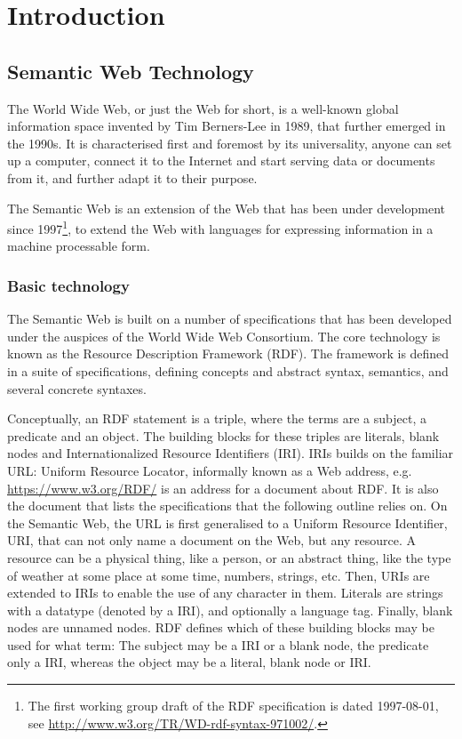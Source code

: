 \chapter{Introduction}

\section{Semantic Web Technology}\label{sec:semwebtech}

The World Wide Web, or just the Web for short, is a well-known global
information space invented by Tim Berners-Lee in 1989, that further emerged
in the 1990s. It is characterised first and foremost by its
universality, anyone can set up a computer, connect it to the Internet and
start serving data or documents from it, and further adapt it to their purpose. 

The Semantic Web is an extension of the Web that has been under
development since 1997\footnote{The first working group draft of the
  RDF specification is dated 1997-08-01, see
  \url{http://www.w3.org/TR/WD-rdf-syntax-971002/}.}, to extend the
Web with languages for expressing information in a machine processable
form\cite{semwebroadmap}.

\subsection{Basic technology}

The Semantic Web is built on a number of specifications that has been
developed under the auspices of the World Wide Web Consortium. The
core technology is known as the Resource Description Framework
(RDF). The framework is defined in a suite of specifications, defining
concepts and abstract syntax, semantics, and several concrete
syntaxes.

Conceptually, an RDF statement is a triple, where the terms are a
subject, a predicate and an object. The building blocks for these
triples are literals, blank nodes and Internationalized Resource
Identifiers (IRI). IRIs builds on the familiar URL: Uniform Resource
Locator, informally known as a Web address,
e.g. \url{https://www.w3.org/RDF/} is an address for a document about
RDF. It is also the document that lists the specifications that the
following outline relies on. 
On the Semantic Web, the URL is first generalised to a Uniform
Resource Identifier, URI, that can not only name a document on the
Web, but any resource. A resource can be a physical thing, like a
person, or an abstract thing, like the type of weather at some place
at some time, numbers, strings, etc. Then, URIs are extended to IRIs
to enable the use of any character in them. Literals are strings with
a datatype (denoted by a IRI), and optionally a language tag. Finally,
blank nodes are unnamed nodes. RDF defines which of these building
blocks may be used for what term: The subject may be a IRI or a blank
node, the predicate only a IRI, whereas the object may be a literal,
blank node or IRI.

